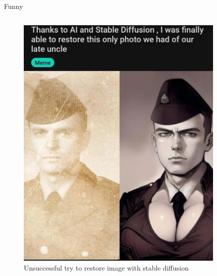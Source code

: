 \documentclass[xcolor=table]{beamer}
\begin{document}
\begin{frame}[containsverbatim]{Funny}
\begin{columns}
\begin{column}{0.5\textwidth}
    \begin{figure}
        \centering
        \includegraphics[width=0.9\textwidth]{img/falied-image-restoration.jpg}
        \caption{Unsuccessful try to restore image with stable diffusion}
    \end{figure}
\end{column}


\end{columns}
\end{frame}
\end{document}
